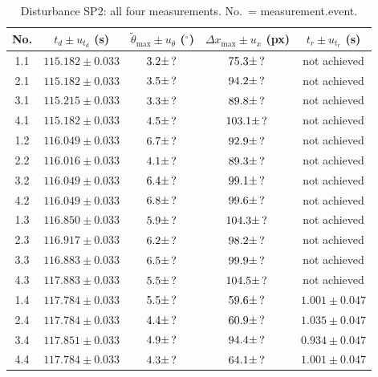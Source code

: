 \documentclass[11pt,a4paper]{article}
\begin{document}
\begin{table}[H]
    \centering
    \caption{Disturbance SP2: all four measurements. No.\ = measurement.event.}
    \label{tab:sp2_disturbance}
    \renewcommand{\arraystretch}{1.6}
    \begin{tabular}{|c|c|c|c|c|}
        \hline
        No.
        & $t_d \pm u_{t_d}$ (s)
        & $\tilde{\theta}_\text{max} \pm u_\theta$ ($^\circ$)
        & $\Delta x_\text{max} \pm u_x$ (px)
        & $t_r \pm u_{t_r}$ (s) \\
        \hline
        1.1 & $115.182 \pm 0.033$ & $3.2 \pm \,?\,$ & $75.3 \pm \,?\,$  & not achieved \\ \hline
        2.1 & $115.182 \pm 0.033$ & $3.5 \pm \,?\,$ & $94.2 \pm \,?\,$  & not achieved \\ \hline
        3.1 & $115.215 \pm 0.033$ & $3.3 \pm \,?\,$ & $89.8 \pm \,?\,$  & not achieved \\ \hline
        4.1 & $115.182 \pm 0.033$ & $4.5 \pm \,?\,$ & $103.1 \pm \,?\,$ & not achieved \\ \hline\hline
        1.2 & $116.049 \pm 0.033$ & $6.7 \pm \,?\,$ & $92.9 \pm \,?\,$  & not achieved \\ \hline
        2.2 & $116.016 \pm 0.033$ & $4.1 \pm \,?\,$ & $89.3 \pm \,?\,$  & not achieved \\ \hline
        3.2 & $116.049 \pm 0.033$ & $6.4 \pm \,?\,$ & $99.1 \pm \,?\,$  & not achieved \\ \hline
        4.2 & $116.049 \pm 0.033$ & $6.8 \pm \,?\,$ & $99.6 \pm \,?\,$  & not achieved \\ \hline\hline
        1.3 & $116.850 \pm 0.033$ & $5.9 \pm \,?\,$ & $104.3 \pm \,?\,$ & not achieved \\ \hline
        2.3 & $116.917 \pm 0.033$ & $6.2 \pm \,?\,$ & $98.2 \pm \,?\,$  & not achieved \\ \hline
        3.3 & $116.883 \pm 0.033$ & $6.5 \pm \,?\,$ & $99.9 \pm \,?\,$  & not achieved \\ \hline
        4.3 & $117.883 \pm 0.033$ & $5.5 \pm \,?\,$ & $104.5 \pm \,?\,$ & not achieved \\ \hline\hline
        1.4 & $117.784 \pm 0.033$ & $5.5 \pm \,?\,$ & $59.6 \pm \,?\,$  & $1.001 \pm 0.047$ \\ \hline
        2.4 & $117.784 \pm 0.033$ & $4.4 \pm \,?\,$ & $60.9 \pm \,?\,$  & $1.035 \pm 0.047$ \\ \hline
        3.4 & $117.851 \pm 0.033$ & $4.9 \pm \,?\,$ & $94.4 \pm \,?\,$  & $0.934 \pm 0.047$ \\ \hline
        4.4 & $117.784 \pm 0.033$ & $4.3 \pm \,?\,$ & $64.1 \pm \,?\,$  & $1.001 \pm 0.047$ \\ \hline
    \end{tabular}
\end{table}
\end{document}
